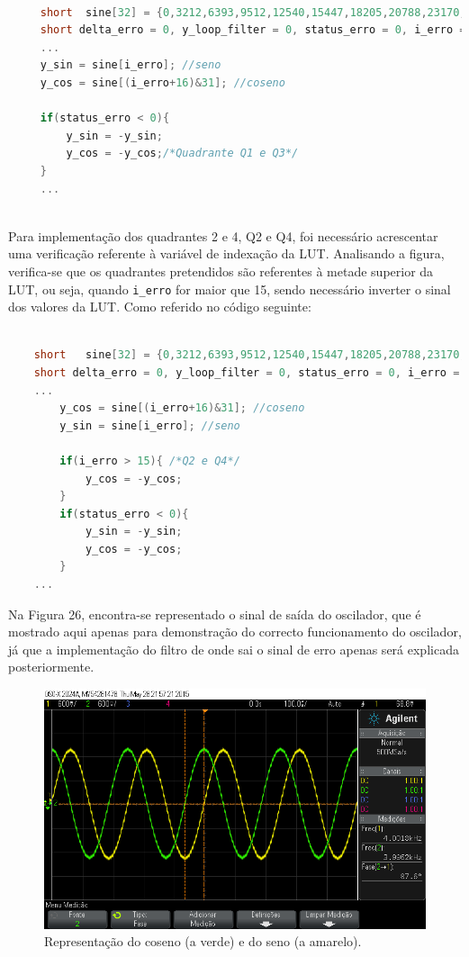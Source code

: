 \documentclass[11pt]{article}
\numberwithin{equation}{section}
\begin{document}
 \begin{lstlisting}[language=C]
 
	 short	sine[32] = {0,3212,6393,9512,12540,15447,18205,20788,23170,25330,27246,28899,30274,31357,		32138,32610,32767,32610,32138,31357,30274,28899,27246,25330,23170,20788,18205,		15447,12540,9512,6393,3212}; 
	 short delta_erro = 0, y_loop_filter = 0, status_erro = 0, i_erro = 0, y_sin = 0,y_coseno = 0;
	 ...
	 y_sin = sine[i_erro]; //seno
	 y_cos = sine[(i_erro+16)&31]; //coseno
	 
	 if(status_erro < 0){
		 y_sin = -y_sin;
		 y_cos = -y_cos;/*Quadrante Q1 e Q3*/
	 }	
	 ...
 
 \end{lstlisting}
 
  Para implementação dos quadrantes 2 e 4, Q2 e Q4, foi necessário acrescentar uma verificação referente à variável de	indexação da LUT. Analisando a figura, verifica-se que os quadrantes pretendidos são referentes à metade superior da LUT, ou seja, quando \texttt{i\_erro} for maior que 15, sendo necessário inverter o sinal dos valores da LUT. Como referido no código seguinte:
  
\begin{lstlisting}[language=C]

	short	sine[32] = {0,3212,6393,9512,12540,15447,18205,20788,23170,25330,27246,28899,30274,31357,		32138,32610,32767,32610,32138,31357,30274,28899,27246,25330,23170,20788,18205,	15447,12540,9512,6393,3212}; 
	short delta_erro = 0, y_loop_filter = 0, status_erro = 0, i_erro = 0, y_cos = 0, y_sin = 0;
	...
		y_cos = sine[(i_erro+16)&31]; //coseno
		y_sin = sine[i_erro]; //seno

		if(i_erro > 15){ /*Q2 e Q4*/
			y_cos = -y_cos;
		}
		if(status_erro < 0){
			y_sin = -y_sin;
			y_cos = -y_cos;
		}	
	...
\end{lstlisting}

Na Figura 26, encontra-se representado o sinal de saída do oscilador, que é mostrado aqui apenas para demonstração do correcto funcionamento do oscilador, já que a implementação do filtro de onde sai o sinal de erro apenas será explicada posteriormente. 

\begin{figure}[H]
	\centering
	\includegraphics[keepaspectratio=true, scale=0.37]{exps/SinVsCos}
	\caption{Representação do coseno (a verde) e do seno (a amarelo).}
	\vspace{-0.8em}
\end{figure}
\end{document}
